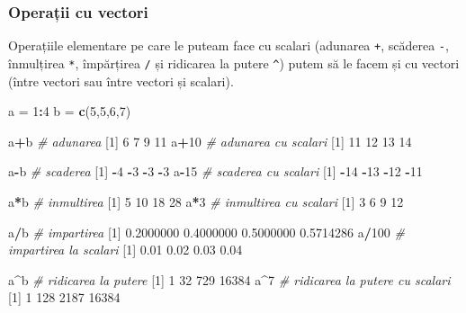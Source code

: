 \documentclass[]{article}
\newenvironment{Shaded}{\begin{snugshade}}{\end{snugshade}}
\newcommand{\KeywordTok}[1]{\textcolor[rgb]{0.13,0.29,0.53}{\textbf{#1}}}
\newcommand{\DecValTok}[1]{\textcolor[rgb]{0.00,0.00,0.81}{#1}}
\newcommand{\FloatTok}[1]{\textcolor[rgb]{0.00,0.00,0.81}{#1}}
\newcommand{\StringTok}[1]{\textcolor[rgb]{0.31,0.60,0.02}{#1}}
\newcommand{\CommentTok}[1]{\textcolor[rgb]{0.56,0.35,0.01}{\textit{#1}}}
\newcommand{\OperatorTok}[1]{\textcolor[rgb]{0.81,0.36,0.00}{\textbf{#1}}}
\newcommand{\NormalTok}[1]{#1}
\begin{document}
\subsubsection{Operații cu vectori}\label{operatii-cu-vectori}

Operațiile elementare pe care le puteam face cu scalari (adunarea
\texttt{+}, scăderea \texttt{-}, înmulțirea \texttt{*}, împărțirea
\texttt{/} și ridicarea la putere \texttt{\^{}}) putem să le facem și cu
vectori (între vectori sau între vectori și scalari).

\begin{Shaded}
\begin{Highlighting}[]
\NormalTok{a =}\StringTok{ }\DecValTok{1}\OperatorTok{:}\DecValTok{4}
\NormalTok{b =}\StringTok{ }\KeywordTok{c}\NormalTok{(}\DecValTok{5}\NormalTok{,}\DecValTok{5}\NormalTok{,}\DecValTok{6}\NormalTok{,}\DecValTok{7}\NormalTok{)}

\NormalTok{a}\OperatorTok{+}\NormalTok{b  }\CommentTok{# adunarea }
\NormalTok{[}\DecValTok{1}\NormalTok{]  }\DecValTok{6}  \DecValTok{7}  \DecValTok{9} \DecValTok{11}
\NormalTok{a}\OperatorTok{+}\DecValTok{10} \CommentTok{# adunarea cu scalari}
\NormalTok{[}\DecValTok{1}\NormalTok{] }\DecValTok{11} \DecValTok{12} \DecValTok{13} \DecValTok{14}

\NormalTok{a}\OperatorTok{-}\NormalTok{b  }\CommentTok{# scaderea}
\NormalTok{[}\DecValTok{1}\NormalTok{] }\OperatorTok{-}\DecValTok{4} \OperatorTok{-}\DecValTok{3} \OperatorTok{-}\DecValTok{3} \OperatorTok{-}\DecValTok{3}
\NormalTok{a}\OperatorTok{-}\DecValTok{15} \CommentTok{# scaderea cu scalari}
\NormalTok{[}\DecValTok{1}\NormalTok{] }\OperatorTok{-}\DecValTok{14} \OperatorTok{-}\DecValTok{13} \OperatorTok{-}\DecValTok{12} \OperatorTok{-}\DecValTok{11}

\NormalTok{a}\OperatorTok{*}\NormalTok{b }\CommentTok{# inmultirea}
\NormalTok{[}\DecValTok{1}\NormalTok{]  }\DecValTok{5} \DecValTok{10} \DecValTok{18} \DecValTok{28}
\NormalTok{a}\OperatorTok{*}\DecValTok{3} \CommentTok{# inmultirea cu scalari}
\NormalTok{[}\DecValTok{1}\NormalTok{]  }\DecValTok{3}  \DecValTok{6}  \DecValTok{9} \DecValTok{12}

\NormalTok{a}\OperatorTok{/}\NormalTok{b }\CommentTok{# impartirea}
\NormalTok{[}\DecValTok{1}\NormalTok{] }\FloatTok{0.2000000} \FloatTok{0.4000000} \FloatTok{0.5000000} \FloatTok{0.5714286}
\NormalTok{a}\OperatorTok{/}\DecValTok{100} \CommentTok{# impartirea la scalari}
\NormalTok{[}\DecValTok{1}\NormalTok{] }\FloatTok{0.01} \FloatTok{0.02} \FloatTok{0.03} \FloatTok{0.04}

\NormalTok{a}\OperatorTok{^}\NormalTok{b }\CommentTok{# ridicarea la putere}
\NormalTok{[}\DecValTok{1}\NormalTok{]     }\DecValTok{1}    \DecValTok{32}   \DecValTok{729} \DecValTok{16384}
\NormalTok{a}\OperatorTok{^}\DecValTok{7} \CommentTok{# ridicarea la putere cu scalari}
\NormalTok{[}\DecValTok{1}\NormalTok{]     }\DecValTok{1}   \DecValTok{128}  \DecValTok{2187} \DecValTok{16384}
\end{Highlighting}
\end{Shaded}
\end{document}
